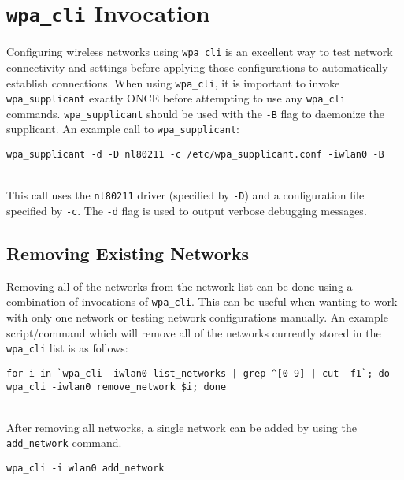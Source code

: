 \section{\texttt{wpa\_cli} Invocation}
\label{sec:wpacliinvocation}

Configuring wireless networks using \texttt{wpa\_cli} is an excellent way to test network connectivity and settings before applying those configurations to automatically establish connections. When using \texttt{wpa\_cli}, it is important to invoke \texttt{wpa\_supplicant} exactly ONCE before attempting to use any \texttt{wpa\_cli} commands. \texttt{wpa\_supplicant} should be used with the \texttt{-B} flag to daemonize the supplicant. An example call to \texttt{wpa\_supplicant}: \\

\begin{lstlisting}[style=text]
wpa_supplicant -d -D nl80211 -c /etc/wpa_supplicant.conf -iwlan0 -B
\end{lstlisting}

~\\
\noindent
This call uses the \texttt{nl80211} driver (specified by \texttt{-D}) and a configuration file specified by \texttt{-c}. The \texttt{-d} flag is used to output verbose debugging messages.\\

\subsection{Removing Existing Networks}
Removing all of the networks from the network list can be done using a combination of invocations of \texttt{wpa\_cli}. This can be useful when wanting to work with only one network or testing network configurations manually. An example script/command which will remove all of the networks currently stored in the \texttt{wpa\_cli} list is as follows: \\

\begin{lstlisting}[style=text]
for i in `wpa_cli -iwlan0 list_networks | grep ^[0-9] | cut -f1`; do wpa_cli -iwlan0 remove_network $i; done
\end{lstlisting}

~\\
\noindent
After removing all networks, a single network can be added by using the \texttt{add\_network} command. \\

\begin{lstlisting}
wpa_cli -i wlan0 add_network
\end{lstlisting}



